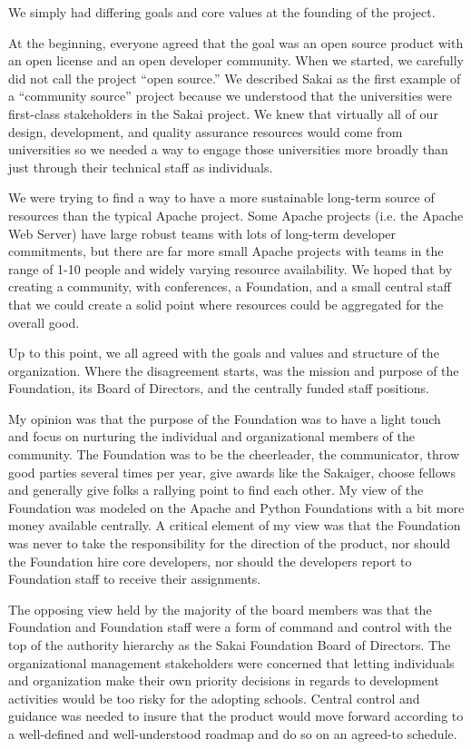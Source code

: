 \documentclass[12pt]{book}
\begin{document}
We simply had differing goals and core values at the founding
of the project.

At the beginning, everyone agreed that the goal was an open source
product with an open license and an open developer community.
When we started, we carefully did not call the project
``open source.''  We described Sakai as the first example
of a ``community source''
project because we understood that the universities were first-class
stakeholders in the Sakai project.  We knew that virtually all of our design,
development, and quality assurance resources would come from universities so
we needed a way to engage those universities more broadly than just through
their technical staff as individuals.

We were trying to find a way to have a more sustainable long-term source
of resources than the typical Apache project.  Some Apache projects (i.e.
the Apache Web Server) have large robust teams with lots of long-term developer
commitments, but there are far more small Apache projects with teams in the range
of 1-10 people and widely varying resource availability.   We hoped that by
creating a community, with conferences, a Foundation, and a small central staff
that we could create a solid point where resources could be aggregated for the
overall good.

Up to this point, we all agreed with the goals and values and structure
of the organization.  Where the disagreement starts, was the mission
and purpose of the Foundation, its Board of Directors, and the centrally
funded staff positions.

My opinion was that the purpose of the Foundation was to have a light
touch and focus on nurturing the individual and organizational members
of the community.   The Foundation was to be the cheerleader, the communicator,
throw good parties several times per year, give awards like the Sakaiger,
choose fellows and generally give folks a rallying point to find each other.
My view of the Foundation was modeled on
the Apache and Python Foundations
with a bit more money available centrally.   A critical element of my view
was that the Foundation was never to take the responsibility for the direction
of the product, nor should the Foundation hire core developers, nor should the
developers report to Foundation staff to receive their assignments.

The opposing view held by the majority of the board members was that
the Foundation and Foundation staff
were a form of command and control with the top of the authority
hierarchy as the Sakai Foundation Board of Directors.  The organizational
management stakeholders were concerned that letting individuals
and organization make their own priority decisions in regards to development
activities would be too risky for the adopting schools.   Central control and
guidance was needed to insure that the product would move forward according to
a well-defined and well-understood roadmap and do so on an agreed-to schedule.
\end{document}
